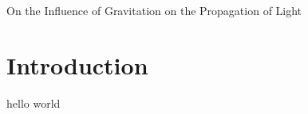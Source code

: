 \paperheader
	{On the Influence of Gravitation on the Propagation of Light}
	{}
	{}

\section{Introduction}
hello world